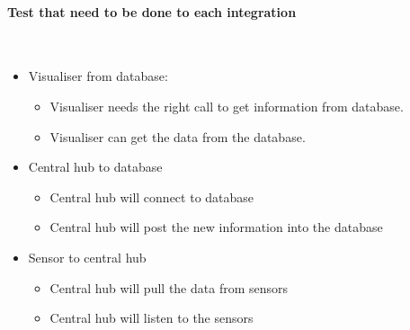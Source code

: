 \documentclass[../document]{subfiles}
\begin{document}
\paragraph{Test that need to be done to each integration} \ \\
\begin{itemize}
	\item
	Visualiser from database:
	\begin{itemize}
		\item
		Visualiser needs the right call to get information from database.
		\item
		Visualiser can get the data from the database.
	\end{itemize}
	\item
	Central hub to database
	\begin{itemize}
		\item
		Central hub will connect to database
		\item
		Central hub will post the new information into the database
	\end{itemize}
	\item
	Sensor to central hub
	\begin{itemize}
		\item
		Central hub will pull the data from sensors
		\item
		Central hub will listen to the sensors
	\end{itemize}
\end{itemize}
\end{document}
